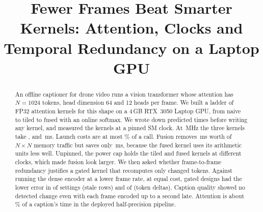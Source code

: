 \documentclass[conference]{IEEEtran}
\newcommand{\NxN}{$N\times N$}
\begin{document}

\title{Fewer Frames Beat Smarter Kernels: Attention, Clocks and Temporal Redundancy on a Laptop GPU}

\author{
\and
{}
\and
{}
}

\maketitle

\begin{abstract}
An offline captioner for drone video runs a vision transformer whose attention has $N = 1024$ tokens, head
dimension 64 and 12 heads per frame. We built a ladder of FP32 attention kernels for this shape on a 4\,GB
RTX~3050 Laptop GPU, from naive to tiled to fused with an online softmax. We wrote down predicted times before
writing any kernel, and measured the kernels at a pinned SM clock. At \PinMhz\,MHz the three kernels take
\PinVoneMs, \PinVtwoMs{} and \PinVthreeMs\,ms. Launch costs are at most \PinFixedMaxPct\% of a call. Fusion
removes \NxNFloorMs\,ms worth of \NxN{} memory traffic but saves only \PinSavingMs\,ms, because the fused kernel
uses its arithmetic units less well. Unpinned, the power cap holds the tiled and fused kernels at different
clocks, which made fusion look larger. We then asked whether frame-to-frame redundancy justifies a gated kernel that recomputes only
changed tokens. Against running the dense encoder at a lower frame rate, at equal cost, gated designs had the
lower error in \TierBLower{} of \TierBSettings{} settings (stale rows) and \TierCLower{} of \TierCSettings{} (token
deltas). Caption quality showed no detected change even with each frame encoded up to a second late. Attention is
about \AttnCaptionMeasPct\% of a caption's time in the deployed half-precision pipeline.
\end{abstract}
\end{document}
